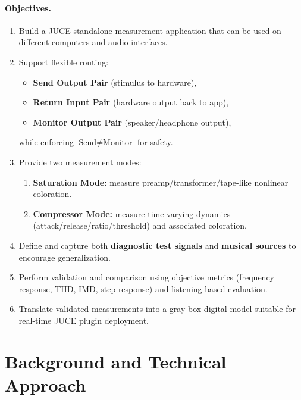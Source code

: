 \documentclass[11pt, letterpaper]{article}
\begin{document}
\paragraph{Objectives.}
\begin{enumerate}[leftmargin=1.5em]
    \item Build a JUCE standalone measurement application that can be used on different computers and
          audio interfaces.
    \item Support flexible routing:
          \begin{itemize}[leftmargin=1.5em]
              \item \textbf{Send Output Pair} (stimulus to hardware),
              \item \textbf{Return Input Pair} (hardware output back to app),
              \item \textbf{Monitor Output Pair} (speaker/headphone output),
          \end{itemize}
          while enforcing $\text{Send} \neq \text{Monitor}$ for safety.
    \item Provide two measurement modes:
          \begin{enumerate}[label=(\alph*), leftmargin=1.5em]
              \item \textbf{Saturation Mode:} measure preamp/transformer/tape-like nonlinear coloration.
              \item \textbf{Compressor Mode:} measure time-varying dynamics (attack/release/ratio/threshold) and
                    associated coloration.
          \end{enumerate}
    \item Define and capture both \textbf{diagnostic test signals} and \textbf{musical sources} to encourage generalization.
    \item Perform validation and comparison using objective metrics (frequency response, THD, IMD,
          step response) and listening-based evaluation.
    \item Translate validated measurements into a gray-box digital model suitable for real-time JUCE
          plugin deployment.
\end{enumerate}

\section{Background and Technical Approach}
\label{sec:background}
\end{document}
